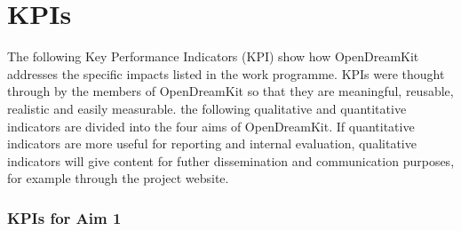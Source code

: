 
\section{KPIs}

\begin{introduction}
 The following Key Performance Indicators (KPI) show how OpenDreamKit addresses the specific impacts listed in the work programme. KPIs were thought through by the members of OpenDreamKit so that they are meaningful, reusable, realistic and easily measurable. the following qualitative and quantitative indicators are divided into the four aims of OpenDreamKit. If quantitative indicators are more useful for reporting and internal evaluation, qualitative indicators will give content for futher dissemination and communication purposes, for example through the project website.
\end{introduction}


\subsubsection{KPIs for Aim 1}

